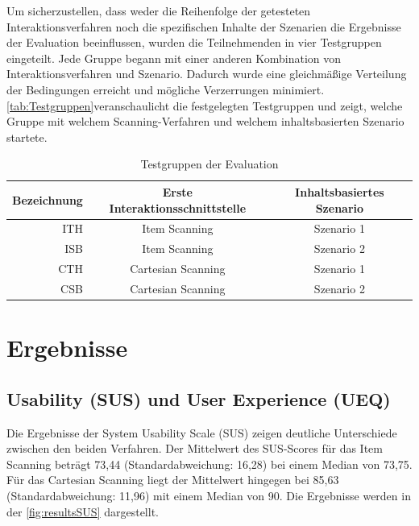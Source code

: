 Um sicherzustellen, dass weder die Reihenfolge der getesteten Interaktionsverfahren noch die spezifischen Inhalte der Szenarien die Ergebnisse der Evaluation beeinflussen, wurden die Teilnehmenden in vier Testgruppen eingeteilt. Jede Gruppe begann mit einer anderen Kombination von Interaktionsverfahren und Szenario. Dadurch wurde eine gleichmäßige Verteilung der Bedingungen erreicht und mögliche Verzerrungen minimiert. \autoref{tab:Testgruppen}veranschaulicht die festgelegten Testgruppen und zeigt, welche Gruppe mit welchem Scanning-Verfahren und welchem inhaltsbasierten Szenario startete. 

\begin{table}[ht]
 \centering
 \begin{tabular}{r|c|c}
 Bezeichnung & Erste Interaktionsschnittstelle & Inhaltsbasiertes Szenario\\
 \hline
 ITH & Item Scanning & Szenario 1\\
 ISB & Item Scanning & Szenario 2\\
 CTH & Cartesian Scanning & Szenario 1\\
 CSB & Cartesian Scanning & Szenario 2\\
 \end{tabular}
 \caption{Testgruppen der Evaluation}
 \label{tab:Testgruppen}
\end{table}

\section{Ergebnisse}

\subsection{Usability (SUS) und User Experience (UEQ)}

Die Ergebnisse der System Usability Scale (SUS) zeigen deutliche Unterschiede zwischen den beiden Verfahren. Der Mittelwert des SUS-Scores für das Item Scanning beträgt 73,44 (Standardabweichung: 16,28) bei einem Median von 73,75. Für das Cartesian Scanning liegt der Mittelwert hingegen bei 85,63 (Standardabweichung: 11,96) mit einem Median von 90. Die Ergebnisse werden in der \autoref{fig:resultsSUS} dargestellt. 


